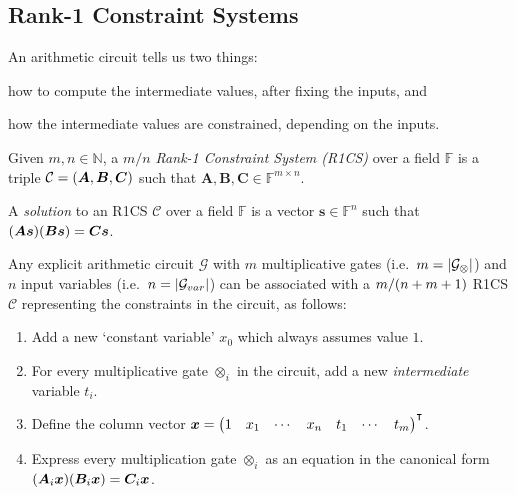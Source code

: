\subsection{Rank-1 Constraint Systems}
An arithmetic circuit tells us two things:
\begin{enumerate*}[label=(\roman*)] %
  \item how to compute the intermediate values, after fixing the inputs, and
  \item  how the intermediate values are constrained, depending on the inputs.
\end{enumerate*}   
\begin{definition}
	Given \(m,n \in \mathbb{N}\), a \emph{\(m/n\) Rank-1 Constraint System (R1CS)} over a field 
	\(\mathbb{F}\) is a triple \(\mathcal{C} = \left(\bm{A}, \bm{B}, \bm{C}\right)\) such that 
  \(\bm{A}, \bm{B}, \bm{C} \in \mathbb{F}^{m \times n}\).
\end{definition}
\begin{definition}[R1CS solution]
  A \emph{solution} to an R1CS \(\mathcal{C}\) over a field \(\mathbb{F}\) is a vector 
  \(\bm{s} \in \mathbb{F}^n\) such that 
  \(\Parens*{\bm{A}\bm{s}}\Parens*{\bm{B}\bm{s}} = \bm{C}\bm{s}\).
\end{definition}
Any explicit arithmetic circuit \(\mathcal{G}\) with \(m\) multiplicative gates 
(i.e.\  \(m = \left\lvert\mathcal{G}_{\otimes}\right\rvert\)) and \(n\) input variables 
(i.e.\  \(n = \left\lvert\mathcal{G}_{var}\right\rvert\)) can be associated with a 
\({m}/\Parens*{n+m+1}\) 
R1CS \(\mathcal{C}\) representing the constraints in the circuit, as follows:
\begin{enumerate}
	\item Add a new `constant variable' \(x_0\) which always assumes value \(1\).
	\item For every multiplicative gate \(\otimes_i \) in the circuit, add a new \emph{intermediate}
	      variable \(t_i\). 
	\item Define the column vector
	      \(\bm{x} = {\begin{pmatrix}1 & x_1 & \cdots & x_n & t_1 & \cdots & t_m \end{pmatrix}}^\transpose \).
	\item Express every multiplication gate \(\otimes_i \) as an equation in the canonical form
	      \(\Parens*{\bm{A}_i\bm{x}}\Parens*{\bm{B}_i\bm{x}} = \bm{C}_i\bm{x}\).
\end{enumerate}

